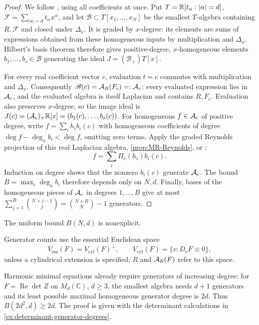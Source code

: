 \begin{proof}
We follow \cite[proof of Lemma~24(a)]{MendesRadeschi}, using all
coefficients at once.
Put \(T=\mathbb R[t_\alpha:|\alpha|=d]\),
\(\mathscr F=\sum_{|\alpha|=d}t_\alpha x^\alpha\), and let
\(\mathscr B\subset T[x_1,\ldots,x_N]\) be the smallest
\(T\)-algebra containing \(R,\mathscr F\) and closed under
\(\Delta_x\). It is graded by \(x\)-degree: its elements are sums
of expressions obtained from these homogeneous inputs by multiplication
and \(\Delta_x\). Hilbert's basis theorem
\cite[Chapter~I, Section~2, Proposition~2.3 and Corollary~2.4, p.~11]{Kunz2013} therefore
gives positive-degree, \(x\)-homogeneous elements
\(b_1,\ldots,b_s\in\mathscr B\) generating the ideal
\(J=(\mathscr B_+)T[x]\).

For every real coefficient vector \(c\), evaluation \(t=c\)
commutes with multiplication and \(\Delta_x\). Consequently
\(\mathscr B(c)=\mathcal A_R(F_c)=:\mathcal A_c\): every evaluated expression
lies in \(\mathcal A_c\), and the evaluated algebra is itself Laplacian
and contains \(R,F_c\). Evaluation also preserves \(x\)-degree,
so the image ideal is \(J(c)=(\mathcal A_c)_+\mathbb R[x]=(b_1(c),\ldots,b_s(c))\).
For homogeneous \(f\in\mathcal A_c\) of positive degree, write
\(f=\sum_i h_i b_i(c)\) with homogeneous coefficients of degree
\(\deg f-\deg_x b_i<\deg f\), omitting zero terms.
Apply the graded Reynolds projection of this real Laplacian algebra,
\cref{prop:MR-Reynolds}, or \cite[Theorem~23]{MendesRadeschi}:
\[
 f=\sum_i\Pi_c(h_i)b_i(c).
\]
Induction on degree shows that the nonzero \(b_i(c)\) generate
\(\mathcal A_c\). The bound \(B=\max_i\deg_x b_i\)
therefore depends only on \(N,d\).
Finally, bases of the homogeneous pieces of \(\mathcal A_c\) in degrees
\(1,\ldots,B\) give at most
\(\sum_{j=1}^B\binom{N+j-1}{j}=\binom{N+B}{N}-1\) generators.
\end{proof}

The uniform bound \(B(N,d)\) is nonexplicit.

\label{par:essential-convention}
Generator counts use the essential Euclidean space
\[
 V_{\mathrm{ess}}(F)=V_{\mathrm{cyl}}(F)^\perp,\qquad
 V_{\mathrm{cyl}}(F)=\{v:D_vF\equiv0\},
\]
unless a cylindrical extension is specified; \(R\) and \(\mathcal A_R(F)\)
refer to this space.

Harmonic minimal equations already require generators of increasing
degree: for \(F=\operatorname{Re}\det Z\) on \(M_d(\mathbb C)\),
\(d\ge3\), the smallest algebra needs \(d+1\) generators and its
least possible maximal homogeneous generator degree is \(2d\).
Thus \(B(2d^2,d)\ge2d\). The proof is given with the determinant
calculations in \cref{ex:determinant-generator-degrees}.

